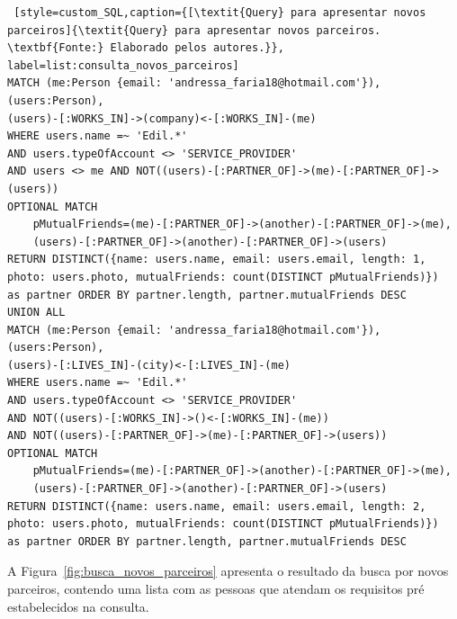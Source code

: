 \begin{lstlisting} [style=custom_SQL,caption={[\textit{Query} para apresentar novos parceiros]{\textit{Query} para apresentar novos parceiros. \textbf{Fonte:} Elaborado pelos autores.}}, label=list:consulta_novos_parceiros] 	
MATCH (me:Person {email: 'andressa_faria18@hotmail.com'}), (users:Person),
(users)-[:WORKS_IN]->(company)<-[:WORKS_IN]-(me)
WHERE users.name =~ 'Edil.*'
AND users.typeOfAccount <> 'SERVICE_PROVIDER'
AND users <> me AND NOT((users)-[:PARTNER_OF]->(me)-[:PARTNER_OF]->(users))  
OPTIONAL MATCH 
	pMutualFriends=(me)-[:PARTNER_OF]->(another)-[:PARTNER_OF]->(me), 
	(users)-[:PARTNER_OF]->(another)-[:PARTNER_OF]->(users) 
RETURN DISTINCT({name: users.name, email: users.email, length: 1, 
photo: users.photo, mutualFriends: count(DISTINCT pMutualFriends)}) 
as partner ORDER BY partner.length, partner.mutualFriends DESC 
UNION ALL 
MATCH (me:Person {email: 'andressa_faria18@hotmail.com'}), (users:Person),
(users)-[:LIVES_IN]-(city)<-[:LIVES_IN]-(me)
WHERE users.name =~ 'Edil.*'
AND users.typeOfAccount <> 'SERVICE_PROVIDER' 
AND NOT((users)-[:WORKS_IN]->()<-[:WORKS_IN]-(me)) 
AND NOT((users)-[:PARTNER_OF]->(me)-[:PARTNER_OF]->(users)) 
OPTIONAL MATCH 
	pMutualFriends=(me)-[:PARTNER_OF]->(another)-[:PARTNER_OF]->(me), 
	(users)-[:PARTNER_OF]->(another)-[:PARTNER_OF]->(users) 
RETURN DISTINCT({name: users.name, email: users.email, length: 2, 
photo: users.photo, mutualFriends: count(DISTINCT pMutualFriends)})
as partner ORDER BY partner.length, partner.mutualFriends DESC
\end{lstlisting}


\par A Figura~\ref{fig:busca_novos_parceiros} apresenta o resultado da busca por novos parceiros, contendo uma lista com as pessoas que atendam os requisitos pré estabelecidos na consulta.

